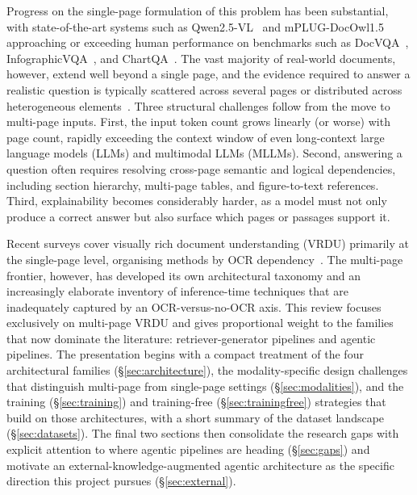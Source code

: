 \documentclass[11pt]{article}
\begin{document}
Progress on the single-page formulation of this problem has been substantial, with state-of-the-art systems such as Qwen2.5-VL~\cite{bai2025qwen2} and mPLUG-DocOwl1.5~\cite{hu2024mplug1.5} approaching or exceeding human performance on benchmarks such as DocVQA~\cite{mathew2021docvqa}, InfographicVQA~\cite{mathew2022infographicvqa}, and ChartQA~\cite{masry2022chartqa}. The vast majority of real-world documents, however, extend well beyond a single page, and the evidence required to answer a realistic question is typically scattered across several pages or distributed across heterogeneous elements~\cite{tito2023hierarchical,blau2024gram,borchmann2025arctic}. Three structural challenges follow from the move to multi-page inputs. First, the input token count grows linearly (or worse) with page count, rapidly exceeding the context window of even long-context large language models (LLMs) and multimodal LLMs (MLLMs). Second, answering a question often requires resolving cross-page semantic and logical dependencies, including section hierarchy, multi-page tables, and figure-to-text references. Third, explainability becomes considerably harder, as a model must not only produce a correct answer but also surface which pages or passages support it.

Recent surveys cover visually rich document understanding (VRDU) primarily at the single-page level, organising methods by OCR dependency~\cite{ding2025survey,huang2022layoutlmv3}. The multi-page frontier, however, has developed its own architectural taxonomy and an increasingly elaborate inventory of inference-time techniques that are inadequately captured by an OCR-versus-no-OCR axis. This review focuses exclusively on multi-page VRDU and gives proportional weight to the families that now dominate the literature: retriever-generator pipelines and agentic pipelines. The presentation begins with a compact treatment of the four architectural families (\S\ref{sec:architecture}), the modality-specific design challenges that distinguish multi-page from single-page settings (\S\ref{sec:modalities}), and the training (\S\ref{sec:training}) and training-free (\S\ref{sec:trainingfree}) strategies that build on those architectures, with a short summary of the dataset landscape (\S\ref{sec:datasets}). The final two sections then consolidate the research gaps with explicit attention to where agentic pipelines are heading (\S\ref{sec:gaps}) and motivate an external-knowledge-augmented agentic architecture as the specific direction this project pursues (\S\ref{sec:external}).
\end{document}
